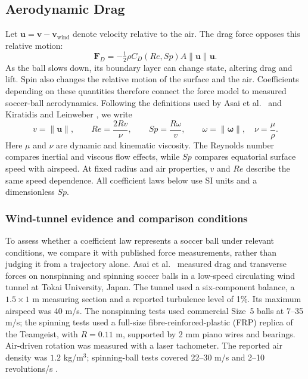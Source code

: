\documentclass[12pt,letterpaper]{article}
\begin{document}
\subsection{Aerodynamic Drag}\label{sec:drag}
Let $\boldsymbol u=\boldsymbol v-\boldsymbol v_{\mathrm{wind}}$ denote velocity relative to the air. The drag force opposes this relative motion:
\begin{equation}
\boldsymbol F_D=-\tfrac12\rho C_D(Re,Sp)A\|\boldsymbol u\|\boldsymbol u.
\label{eq:drag-force}\end{equation}
As the ball slows down, its boundary layer can change state, altering drag and lift. Spin also changes the relative motion of the surface and the air. Coefficients depending on these quantities therefore connect the force model to measured soccer-ball aerodynamics. Following the definitions used by Asai et al.\ \cite{asai2007} and Kiratidis and Leinweber \cite{kiratidis2018}, we write
\begin{equation}
v=\|\boldsymbol u\|,\qquad Re=\frac{2Rv}{\nu},\qquad
Sp=\frac{R\omega}{v},\qquad \omega=\|\boldsymbol\omega\|,\quad \nu=\frac{\mu}{\rho}.
\label{eq:re-sp}\end{equation}
Here $\mu$ and $\nu$ are dynamic and kinematic viscosity. The Reynolds number compares inertial and viscous flow effects, while $Sp$ compares equatorial surface speed with airspeed. At fixed radius and air properties, $v$ and $Re$ describe the same speed dependence. All coefficient laws below use SI units and a dimensionless $Sp$.

\subsubsection{Wind-tunnel evidence and comparison conditions}
To assess whether a coefficient law represents a soccer ball under relevant conditions, we compare it with published force measurements, rather than judging it from a trajectory alone. Asai et al.\ \cite{asai2007} measured drag and transverse forces on nonspinning and spinning soccer balls in a low-speed circulating wind tunnel at Tokai University, Japan. The tunnel used a six-component balance, a $1.5\times1$ m measuring section and a reported turbulence level of 1\%. Its maximum airspeed was 40 m/s. The nonspinning tests used commercial Size~5 balls at 7--35 m/s; the spinning tests used a full-size fibre-reinforced-plastic (FRP) replica of the Teamgeist, with $R=0.11$ m, supported by 2 mm piano wires and bearings. Air-driven rotation was measured with a laser tachometer. The reported air density was $1.2$ kg/m$^3$; spinning-ball tests covered 22--30 m/s and 2--10 revolutions/s \cite{asai2007}.
\end{document}
